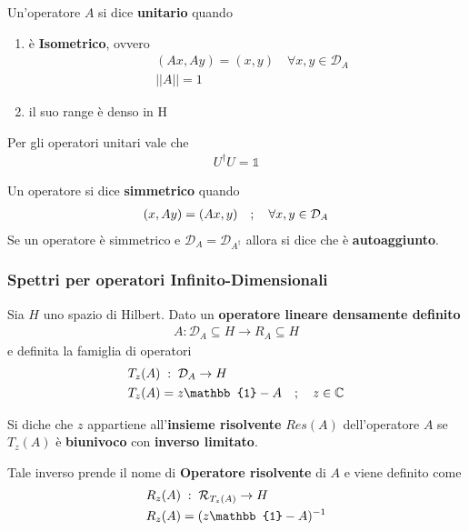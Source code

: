 Un'operatore $A$ si dice \textbf{unitario} quando
\begin{enumerate}
	\item è \textbf{Isometrico}, ovvero 
		\begin{align}
			&(Ax,Ay) = (x,y) \quad \forall x,y \in \mathcal{D}_A\\
			&||A|| = 1
		\end{align}
	\item il suo range è denso in H
\end{enumerate} 
Per gli operatori unitari vale che
\begin{align}
	U^\dagger U = \mathbb{1}
\end{align}

Un operatore si dice \textbf{simmetrico} quando
\begin{align}
	(x,Ay) = (Ax,y) \quad ; \quad \forall x,y \in \mathcal{D}_A
\end{align}
Se un operatore è simmetrico e $\mathcal{D}_A = \mathcal{D}_{A^\dagger}$ allora si dice che è \textbf{autoaggiunto}.


\subsubsection{Spettri per operatori Infinito-Dimensionali}

Sia $H$ uno spazio di Hilbert. Dato un \textbf{operatore lineare densamente definito}
\begin{align}
	A : \mathcal{D}_A \subseteq H \rightarrow R_A \subseteq H
\end{align} 
e definita la famiglia di operatori
\begin{align}
	&T_z(A) \taleche \mathcal{D}_A \rightarrow H\\
	&T_z(A) = z\mathbb{1} - A \spacer z \in \C
\end{align}


Si diche che $z$ appartiene all'\textbf{insieme risolvente} $Res(A)$ dell'operatore $A$ se $T_z (A)$ è \textbf{biunivoco} con \textbf{inverso limitato}.

Tale inverso prende il nome di \textbf{Operatore risolvente} di $A$ e viene definito come
\begin{align}
	&R_z(A) \taleche \mathcal{R}_{T_z(A)} \rightarrow H\\
	&R_z(A) = (z\mathbb{1} - A)^{-1}
\end{align}

